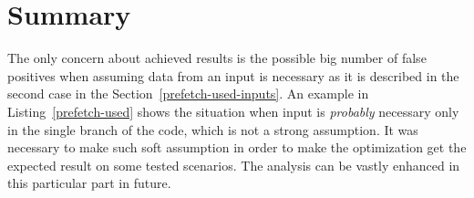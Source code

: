 \section{Summary}
The only concern about achieved results is the possible big number of false positives when assuming data from an input is necessary as it is described in the second case in the Section~\ref{prefetch-used-inputs}. An example in Listing~\ref{prefetch-used} shows the situation when input is \emph{probably} necessary only in the single branch of the code, which is not a strong assumption. It was necessary to make such soft assumption in order to make the optimization get the expected result on some tested scenarios. The analysis can be vastly enhanced in this particular part in future.